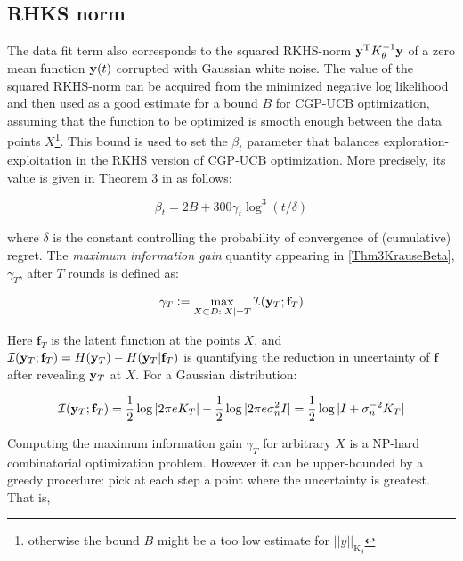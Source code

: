 \subsection*{RHKS norm}
The data fit term also corresponds to the squared RKHS-norm $\mathbf{y}^{\mathrm{T}}K_{\theta}^{-1}\mathbf{y}$ of a zero mean function $\mathbf{y}(t)$ corrupted with Gaussian white noise. The value of the squared RKHS-norm can be acquired from the minimized negative log likelihood and then used as a good estimate for a bound $B$ for CGP-UCB optimization, assuming that the function to be optimized is smooth enough between the data points $X$\footnote{otherwise the bound $B$ might be a too low estimate for $||y||_{\mathrm{K_\theta}}$}. This bound is used to set the $\beta_t$ parameter that balances exploration-exploitation in the RKHS version of CGP-UCB optimization. More precisely, its value is given in Theorem 3 in \cite{Krause1} as follows:

\begin{equation}
\beta_{t} = 2B + 300 \gamma_t \log^{3}(t/\delta) \label{Thm3KrauseBeta}
\end{equation}

where $\delta$ is the constant controlling the probability of convergence of (cumulative) regret. The \emph{maximum information gain} quantity appearing in \eqref{Thm3KrauseBeta}, $\gamma_{T}$, after $T$ rounds is defined as:

\begin{equation}
\gamma_{T} \mathrel{\mathop:}= \max_{X \subset D: |X|=T} \mathcal{I}(\mathbf{y}_{T}; \mathbf{f}_{T}) \label{maxInfoGain}
\end{equation}

Here $\mathbf{f}_{T}$ is the latent function at the points $X$, and $\mathcal{I}(\mathbf{y}_{T}; \mathbf{f}_{T}) = H(\mathbf{y}_{T}) - H(\mathbf{y}_{T}|\mathbf{f}_{T})$ is quantifying the reduction in uncertainty of $\mathbf{f}$ after revealing $\mathbf{y}_{T}$ at $X$. For a Gaussian distribution:

\begin{equation}
\mathcal{I}(\mathbf{y}_{T}; \mathbf{f}_{T}) = \frac{1}{2}\log|2\pi e K_{T}| -  \frac{1}{2}\log|2\pi e \sigma_{n}^{2}I| = \frac{1}{2}\log|I + \sigma_{n}^{-2} K_{T}|
\end{equation}

Computing the maximum information gain $\gamma_{T}$ for arbitrary $X$ is a NP-hard combinatorial optimization problem. However it can be upper-bounded by a greedy procedure: pick at each step a point where the uncertainty is greatest. That is,

